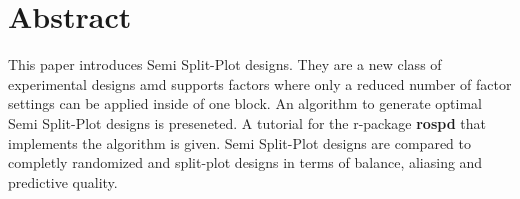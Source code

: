 
\section*{Abstract}

This paper introduces Semi Split-Plot designs. They are a new class of experimental designs amd supports factors where only a reduced number of factor settings can be applied inside of one block. An algorithm to generate optimal Semi Split-Plot designs is preseneted. A tutorial for the r-package \textbf{rospd} that implements the algorithm is given. Semi Split-Plot designs are compared to completly randomized and split-plot designs in terms of balance, aliasing and predictive quality.
